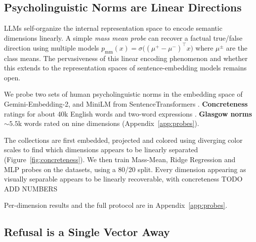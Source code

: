 \documentclass[11pt]{article}
\begin{document}
\subsection{Psycholinguistic Norms are Linear Directions}
\label{sec:glasgow}

LLMs self-organize the internal representation space to encode semantic dimensions linearly\cite{Marks2023TheGO}. A simple \textit{mass mean probe} can recover a factual true/false direction using multiple models $p_{\mathrm{mm}}(x)=\sigma\!\big((\mu^{+}-\mu^{-})^{\top}x\big)$ where $\mu^{\pm}$ are the class means. The pervasiveness of this linear encoding phenomenon and whether this extends to the representation spaces of sentence-embedding models  remains open. 

We probe two sets of human psycholinguistic norms in the embedding space of Gemini-Embedding-2, and MiniLM from SentenceTransformers \cite{reimers-gurevych-2019-sentence}. \textbf{Concreteness} ratings for about 40k English words and two-word expressions \cite{Brysbaert2014-py}. \textbf{Glasgow norms} ${\sim}5.5$k words rated on nine dimensions (Appendix~\ref{app:probes}).


The collections are first embedded, projected and colored using diverging color scales to find which dimensions appears to be linearly separated (Figure~\ref{fig:concreteness}). We then train Mass-Mean, Ridge Regression and MLP probes on the datasets, using a 80/20 split. Every dimension appearing as visually separable appears to be linearly recoverable, with concreteness TODO ADD NUMBERS 

Per-dimension results and the full protocol are in Appendix~\ref{app:probes}.


\subsection{Refusal is a Single Vector Away}
\label{sec:refusal}
\end{document}
